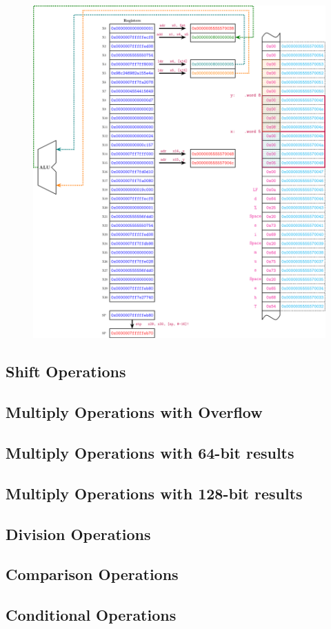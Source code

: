 \begin{figure}[h!]\centering
	\includegraphics[width=1.5\textwidth]{architectures/sum.pdf}
\end{figure}

\newpage
\subsection{Shift Operations}
\subsection{Multiply Operations with Overflow}
\subsection{Multiply Operations with 64-bit results}
\subsection{Multiply Operations with 128-bit results}
\subsection{Division Operations}
\subsection{Comparison Operations}
\subsection{Conditional Operations}

